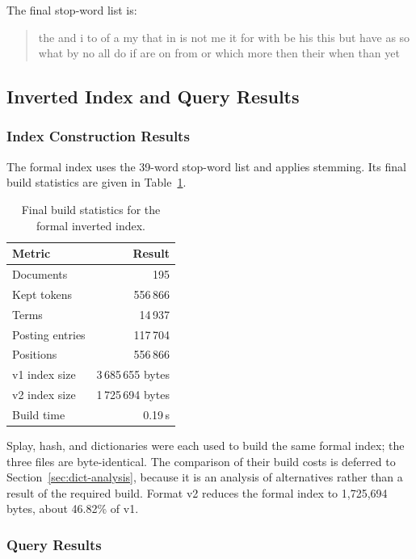 The final stop-word list is:

\begin{quote}
\raggedright\ttfamily\small
the and i to of a my that in is not me it for with be his this but have as so
what by no all do if are on from or which more then their when than yet
\end{quote}

\subsection{Inverted Index and Query Results}

\subsubsection{Index Construction Results}
\label{sec:index-build}

The formal index uses the 39-word stop-word list and applies stemming. Its
final build statistics are given in Table~\ref{tab:index-configs}.

\begin{table}[!htbp]
  \centering
  \caption{Final build statistics for the formal inverted index.}
  \label{tab:index-configs}
  \small
  \begin{tabular}{lr}
    \toprule
    Metric & Result \\
    \midrule
    Documents & 195 \\
    Kept tokens & 556\,866 \\
    Terms & 14\,937 \\
    Posting entries & 117\,704 \\
    Positions & 556\,866 \\
    v1 index size & 3\,685\,655 bytes \\
    v2 index size & 1\,725\,694 bytes \\
    Build time & 0.19\,s \\
    \bottomrule
  \end{tabular}
\end{table}

Splay, hash, and  dictionaries were each used to build the same
formal index; the three files are byte-identical. The comparison of their build
costs is deferred to Section~\ref{sec:dict-analysis}, because it is an analysis
of alternatives rather than a result of the required build. Format v2 reduces
the formal index to 1,725,694 bytes, about 46.82\% of v1.

\subsubsection{Query Results}
\label{sec:query}

